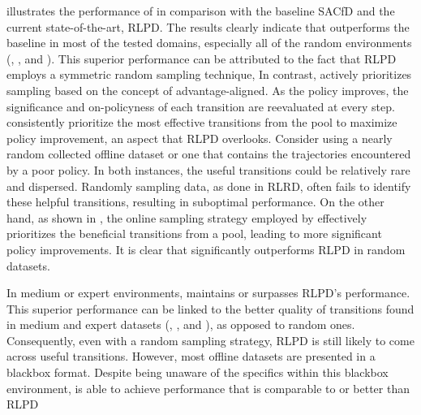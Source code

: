  illustrates the performance of \algname in comparison with the baseline SACfD and the current state-of-the-art, RLPD. The results clearly indicate that \algname outperforms the baseline in most of the tested domains, especially all of the random environments (, ,  and ). 
This superior performance can be attributed to the fact that RLPD employs a symmetric random sampling technique, 
In contrast, 
\algname actively prioritizes sampling based on the concept of advantage-aligned. As the policy improves, the significance and on-policyness of each transition are reevaluated at every step. \algname consistently prioritize the most effective transitions from the pool to maximize policy improvement, an aspect that RLPD overlooks. 
Consider using a nearly random collected offline dataset or one that contains the trajectories encountered by a poor policy.
In both instances, the useful transitions could be relatively rare and dispersed. Randomly sampling data, as done in RLRD, often fails to identify these helpful transitions, resulting in suboptimal performance. On the other hand, as shown in , the online sampling strategy employed by \algname effectively prioritizes the beneficial transitions from a pool, leading to more significant policy improvements.
It is clear that \algname significantly outperforms RLPD in random datasets. 

In medium or expert environments, \algname maintains or surpasses RLPD's performance. This superior performance can be linked to the better quality of transitions found in medium and expert datasets (, ,  and ), as opposed to random ones. Consequently, even with a random sampling strategy, RLPD is still likely to come across useful transitions. However, most offline datasets are presented in a blackbox format. Despite being unaware of the specifics within this blackbox environment, \algname is able to achieve performance that is comparable to or better than RLPD


